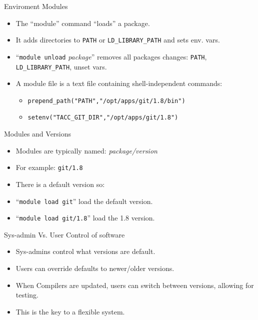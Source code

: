 \documentclass{beamer}
\begin{document}
\begin{frame}{Enviroment Modules }
  \begin{itemize}
    \item The ``module'' command ``loads'' a package.
    \item It adds directories to \texttt{PATH} or \texttt{LD\_LIBRARY\_PATH} and
      sets env. vars.
    \item ``\texttt{module unload} \emph{package}'' removes all packages
      changes: \texttt{PATH}, \texttt{LD\_LIBRARY\_PATH}, unset vars.
    \item A module file is a text file containing shell-independent commands:
      \begin{itemize}
        \item \texttt{prepend\_path("PATH","/opt/apps/git/1.8/bin")}
        \item \texttt{setenv("TACC\_GIT\_DIR","/opt/apps/git/1.8")}
      \end{itemize}
  \end{itemize}
\end{frame}

\begin{frame}{Modules and Versions}
  \begin{itemize}
    \item Modules are typically named: \emph{package/version}
    \item For example: \texttt{git/1.8}
    \item There is a default version so:
    \item ``\texttt{module load git}'' load the default version.
    \item ``\texttt{module load git/1.8}'' load the 1.8 version.
  \end{itemize}
\end{frame}

\begin{frame}{Sys-admin Vs. User Control of software}
  \begin{itemize}
    \item Sys-admins control what versions are default.
    \item Users can override defaults to newer/older versions.
    \item When Compilers are updated, users can switch between
      versions, allowing for testing.
    \item This is the key to a flexible system.
  \end{itemize}
\end{frame}
\end{document}
